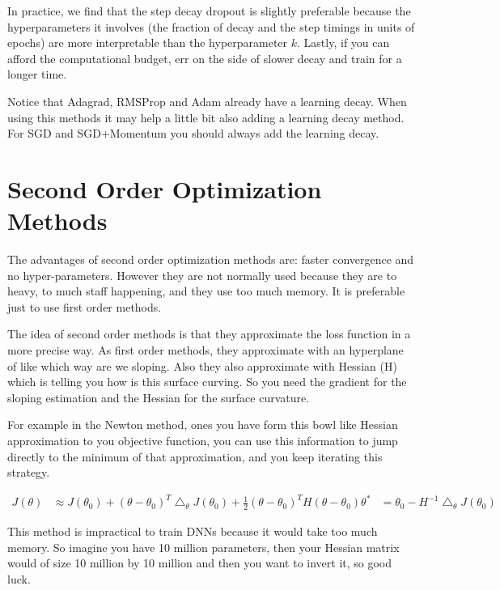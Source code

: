 In practice, we find that the step decay dropout is slightly preferable because the hyperparameters it involves (the fraction of decay and the step timings in units of epochs) are more interpretable than the hyperparameter $k$. Lastly, if you can afford the computational budget, err on the side of slower decay and train for a longer time.

Notice that Adagrad, RMSProp and Adam already have a learning decay. When using this methods it may help a little bit also adding a learning decay method. For SGD and SGD+Momentum you should always add the learning decay.

\section*{Second Order Optimization Methods}
The advantages of second order optimization methods are: faster convergence and no hyper-parameters. However they are not normally used because they are to heavy, to much staff happening, and they use too much memory. It is preferable just to use first order methods.

The idea of second order methods is that they approximate the loss function in a more precise way. As first order methods, they approximate with an hyperplane of like which way are we sloping. Also they also approximate with Hessian (H) which is telling you how is this surface curving. So you need the gradient for the sloping estimation and the Hessian for the surface curvature.

For example in the Newton method, ones you have form this bowl like Hessian approximation to you objective function, you can use this information to jump directly to the minimum of that approximation, and you keep iterating this strategy.

\begin{equation}
\begin{aligned}
J(\theta) &\approx J(\theta_0) + (\theta - \theta_0)^T \bigtriangleup_{\theta}J(\theta_0) + \frac{1}{2}(\theta - \theta_0)^T H (\theta - \theta_0)
\theta^\ast &= \theta_0 - H^{-1}\bigtriangleup_{\theta}J(\theta_0)
\end{aligned}
\end{equation}

This method is impractical to train DNNs because it would take too much memory. So imagine you have 10 million parameters, then your Hessian matrix would of size 10 million by 10 million and then you want to invert it, so good luck.


